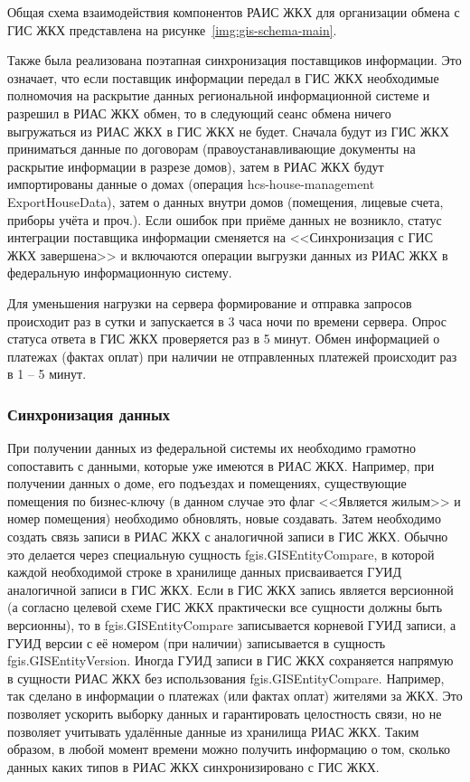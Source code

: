 Общая схема взаимодействия компонентов РАИС ЖКХ для организации обмена с ГИС ЖКХ представлена на рисунке~\ref{img:gis-schema-main}.


Также была реализована поэтапная синхронизация поставщиков информации.
Это означает, что если поставщик информации передал в ГИС ЖКХ необходимые полномочия на раскрытие данных региональной информационной системе и разрешил в РИАС ЖКХ обмен, то в следующий сеанс обмена ничего выгружаться из РИАС ЖКХ в ГИС ЖКХ не будет.
Сначала будут из ГИС ЖКХ приниматься данные по договорам (правоустанавливающие документы на раскрытие информации в разрезе домов), затем в РИАС ЖКХ будут импортированы данные о домах (операция hcs-house-management\\ExportHouseData), затем о данных внутри домов (помещения, лицевые счета, приборы учёта и проч.).
Если ошибок при приёме данных не возникло, статус интеграции поставщика информации сменяется на <<Синхронизация с ГИС ЖКХ завершена>> и включаются операции выгрузки данных из РИАС ЖКХ в федеральную информационную систему.

Для уменьшения нагрузки на сервера формирование и отправка запросов происходит раз в сутки и запускается в 3 часа ночи по времени сервера.
Опрос статуса ответа в ГИС ЖКХ проверяется раз в 5 минут.
Обмен информацией о платежах (фактах оплат) при наличии не отправленных платежей происходит раз в 1 -- 5 минут.

\subsubsection{Синхронизация данных}

При получении данных из федеральной системы их необходимо грамотно сопоставить с данными, которые уже имеются в РИАС ЖКХ.
Например, при получении данных о доме, его подъездах и помещениях, существующие помещения по бизнес-ключу (в данном случае это флаг <<Является жилым>> и номер помещения) необходимо обновлять, новые создавать.
Затем необходимо создать связь записи в РИАС ЖКХ с аналогичной записи в ГИС ЖКХ.
Обычно это делается через специальную сущность fgis.GISEntityCompare, в которой каждой необходимой строке в хранилище данных присваивается ГУИД аналогичной записи в ГИС ЖКХ.
Если в ГИС ЖКХ запись является версионной (а согласно целевой схеме ГИС ЖКХ практически все сущности должны быть версионны), то в fgis.GISEntityCompare записывается корневой ГУИД записи, а ГУИД версии с её номером (при наличии) записывается в сущность fgis.GISEntityVersion.
Иногда ГУИД записи в ГИС ЖКХ сохраняется напрямую в сущности РИАС ЖКХ без использования fgis.GISEntityCompare.
Например, так сделано в информации о платежах (или фактах оплат) жителями за ЖКХ.
Это позволяет ускорить выборку данных и гарантировать целостность связи, но не позволяет учитывать удалённые данные из хранилища РИАС ЖКХ.
Таким образом, в любой момент времени можно получить информацию о том, сколько данных каких типов в РИАС ЖКХ синхронизировано с ГИС ЖКХ.

